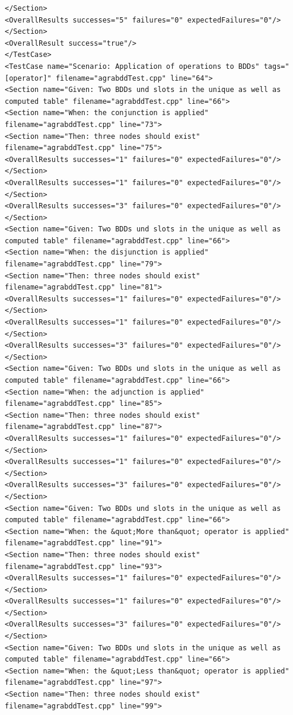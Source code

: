 \begin{verbatim}
</Section>
<OverallResults successes="5" failures="0" expectedFailures="0"/>
</Section>
<OverallResult success="true"/>
</TestCase>
<TestCase name="Scenario: Application of operations to BDDs" tags="[operator]" filename="agrabddTest.cpp" line="64">
<Section name="Given: Two BDDs und slots in the unique as well as computed table" filename="agrabddTest.cpp" line="66">
<Section name="When: the conjunction is applied" filename="agrabddTest.cpp" line="73">
<Section name="Then: three nodes should exist" filename="agrabddTest.cpp" line="75">
<OverallResults successes="1" failures="0" expectedFailures="0"/>
</Section>
<OverallResults successes="1" failures="0" expectedFailures="0"/>
</Section>
<OverallResults successes="3" failures="0" expectedFailures="0"/>
</Section>
<Section name="Given: Two BDDs und slots in the unique as well as computed table" filename="agrabddTest.cpp" line="66">
<Section name="When: the disjunction is applied" filename="agrabddTest.cpp" line="79">
<Section name="Then: three nodes should exist" filename="agrabddTest.cpp" line="81">
<OverallResults successes="1" failures="0" expectedFailures="0"/>
</Section>
<OverallResults successes="1" failures="0" expectedFailures="0"/>
</Section>
<OverallResults successes="3" failures="0" expectedFailures="0"/>
</Section>
<Section name="Given: Two BDDs und slots in the unique as well as computed table" filename="agrabddTest.cpp" line="66">
<Section name="When: the adjunction is applied" filename="agrabddTest.cpp" line="85">
<Section name="Then: three nodes should exist" filename="agrabddTest.cpp" line="87">
<OverallResults successes="1" failures="0" expectedFailures="0"/>
</Section>
<OverallResults successes="1" failures="0" expectedFailures="0"/>
</Section>
<OverallResults successes="3" failures="0" expectedFailures="0"/>
</Section>
<Section name="Given: Two BDDs und slots in the unique as well as computed table" filename="agrabddTest.cpp" line="66">
<Section name="When: the &quot;More than&quot; operator is applied" filename="agrabddTest.cpp" line="91">
<Section name="Then: three nodes should exist" filename="agrabddTest.cpp" line="93">
<OverallResults successes="1" failures="0" expectedFailures="0"/>
</Section>
<OverallResults successes="1" failures="0" expectedFailures="0"/>
</Section>
<OverallResults successes="3" failures="0" expectedFailures="0"/>
</Section>
<Section name="Given: Two BDDs und slots in the unique as well as computed table" filename="agrabddTest.cpp" line="66">
<Section name="When: the &quot;Less than&quot; operator is applied" filename="agrabddTest.cpp" line="97">
<Section name="Then: three nodes should exist" filename="agrabddTest.cpp" line="99">

\end{verbatim}
